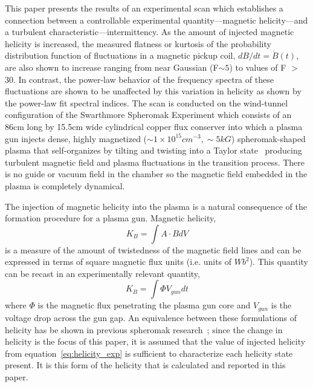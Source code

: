 \documentclass[aps,prl,amsmath,amssymb,reprint,superscriptaddress]{revtex4-1} %
\begin{document}
This paper presents the results of an experimental scan which establishes a connection between a controllable experimental quantity---magnetic helicity---and a turbulent characteristic---intermittency. As the amount of injected magnetic helicity is increased, the measured flatness or kurtosis of the probability distribution function of fluctuations in a magnetic pickup coil, $dB/dt = \dot{B}(t)$, are also shown to increase ranging from near Gaussian (F$\sim 5$) to values of F $>$ 30. In contrast, the power-law behavior of the frequency spectra of these fluctuations are shown to be unaffected by this variation in helicity as shown by the power-law fit spectral indices. The scan is conducted on the wind-tunnel configuration of the Swarthmore Spheromak Experiment which consists of an 86cm long by 15.5cm wide cylindrical copper flux conserver into which a plasma gun injects dense, highly magnetized ($\sim 1\times 10^{15} cm^{-3}, \sim 5kG$) spheromak-shaped plasma that self-organizes by tilting and twisting into a Taylor state~\cite{Gray13,Matthaeus80,Taylor86} producing turbulent magnetic field and plasma fluctuations in the transition process. There is no guide or vacuum field in the chamber so the magnetic field embedded in the plasma is completely dynamical. 

The injection of magnetic helicity into the plasma is a natural consequence of the formation procedure for a plasma gun. Magnetic helicity,
%
\begin{equation}
K_{B} = \int A \cdot B dV
\label{eq:helicity_th}
\end{equation}
%
is a measure of the amount of twistedness of the magnetic field lines and can be expressed in terms of square magnetic flux units (i.e. units of $Wb^{2}$). This quantity can be recast in an experimentally relevant quantity, 
%
\begin{equation}
K_{B} = \int \Phi V_{gun} dt
\label{eq:helicity_exp}
\end{equation}
%
where $\Phi$ is the magnetic flux penetrating the plasma gun core and $V_{gun}$ is the voltage drop across the gun gap. An equivalence between these formulations of helicity has be shown in previous spheromak research~\cite{barnes86}; since the change in helicity is the focus of this paper, it is assumed that the value of injected helicity from equation~\ref{eq:helicity_exp} is sufficient to characterize each helicity state present. It is this form of the helicity that is calculated and reported in this paper.
\end{document}
